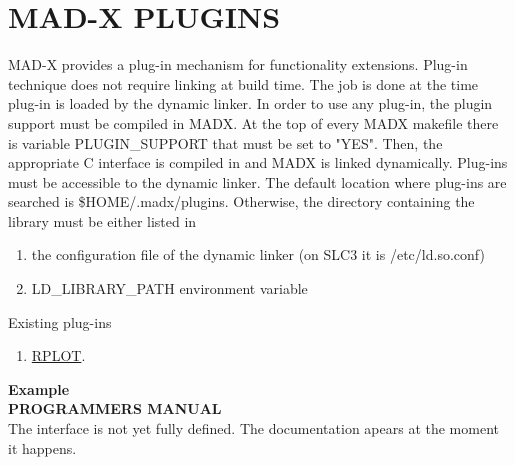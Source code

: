 


\section{MAD-X PLUGINS}



  MAD-X provides a plug-in mechanism for functionality extensions. Plug-in technique does not require linking at build time. The job is done at the time plug-in is loaded by the dynamic linker.  In order to use any plug-in, the plugin support must be compiled in MADX. At the top of every MADX makefile there is variable PLUGIN\_SUPPORT that must be set to "YES".  Then, the appropriate C interface is compiled in and MADX is  linked dynamically.   Plug-ins must be accessible to the dynamic linker.  The default location where plug-ins are searched is \$HOME/.madx/plugins. Otherwise, the directory containing the library must be either listed in  
\begin{enumerate}
	\item  the configuration file of the dynamic linker (on SLC3 it is /etc/ld.so.conf) 
	\item  LD\_LIBRARY\_PATH environment variable 
\end{enumerate}

 Existing plug-ins  
\begin{enumerate}
	\item \href{rplot/index.html}{RPLOT}.
\end{enumerate}

\textbf{ Example }\\



\textbf{ PROGRAMMERS MANUAL  }\\


The interface is not yet fully defined. The documentation apears at the moment it happens.   

